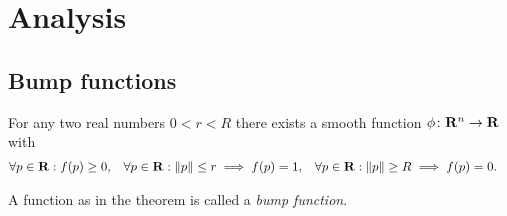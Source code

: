 \chapter{Analysis}

\section{Bump functions}
\label{sec:bump_functions}

\begin{thm}
  \label{thm:bump_function}
  For any two real numbers $0 < r < R$ there exists a smooth
  function $\phi\colon \mathbf{R}^n \to \mathbf{R}$ with
  \begin{align*}
    \forall p \in \mathbf{R}: f(p) & \ge 0, &
    \forall p \in \mathbf{R}: \lVert p\rVert \leq r \implies f(p) & = 1, &
    \forall p \in \mathbf{R}: \lVert p\rVert \geq R \implies f(p) & = 0.
  \end{align*}
\end{thm}

A function as in the theorem is called a \emph{bump function}.

